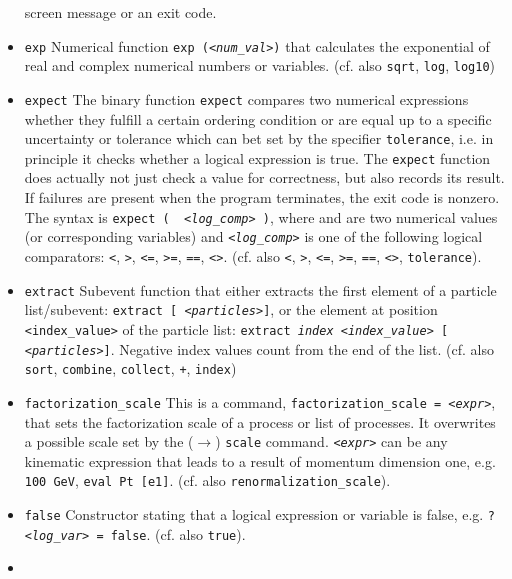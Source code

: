 \documentclass[12pt]{book}
\newcommand{\ttt}[1]{\texttt{#1}}
\begin{document}
\begin{itemize}
screen message or an exit code.
\item
\ttt{exp} \newline
Numerical function \ttt{exp ({\em <num\_val>})} that calculates the
exponential of real and complex numerical numbers or
variables. (cf. also \ttt{sqrt}, \ttt{log}, \ttt{log10})
\item
\ttt{expect} \newline
The binary function \ttt{expect} compares two numerical expressions
whether they fulfill a certain ordering condition or are equal up
to a specific uncertainty or tolerance which can bet set by the
specifier \ttt{tolerance}, i.e. in principle it checks whether a
logical expression is true. The \ttt{expect} function does actually
not just check a value for correctness, but also records its result.
If failures are present when the program terminates, the exit code is
nonzero. The syntax is  \ttt{expect ({\em <num1>} {\em
<log\_comp>} {\em <num2>})}, where \ttt{{\em <num1>}} and
\ttt{{\em <num2>}} are two numerical values (or
corresponding variables) and  \ttt{{\em <log\_comp>}} is one of the following
logical comparators: \ttt{<}, \ttt{>}, \ttt{<=},  \ttt{>=}, \ttt{==},
\ttt{<>}.
(cf. also \ttt{<}, \ttt{>}, \ttt{<=},  \ttt{>=}, \ttt{==}, \ttt{<>},
\ttt{tolerance}).
\item
\ttt{extract} \newline
Subevent function that either extracts the first element of a
particle list/subevent: \ttt{extract [ {\em <particles>}]}, or the
element at position \ttt{<index\_value>} of the particle list:
\ttt{extract {\em index <index\_value>} [ {\em
    <particles>}]}. Negative index values count from the end of the
list. (cf. also \ttt{sort}, \ttt{combine},
\ttt{collect}, \ttt{+}, \ttt{index})
\item
\ttt{factorization\_scale} \newline
This is a command, \ttt{factorization\_scale = {\em <expr>}}, that sets
the factorization scale of a process or list of processes. It
overwrites a possible scale set by the ($\to$) \ttt{scale} command.
\ttt{{\em <expr>}} can be any kinematic expression that leads to a result of
momentum dimension one, e.g. \ttt{100 GeV}, \ttt{eval
Pt [e1]}. (cf. also \ttt{renormalization\_scale}).
\item
\ttt{false} \newline
Constructor stating that a logical expression or variable is false,
e.g. \ttt{?{\em <log\_var>} = false}. (cf. also \ttt{true}).
\item

\end{itemize}
\end{document}
